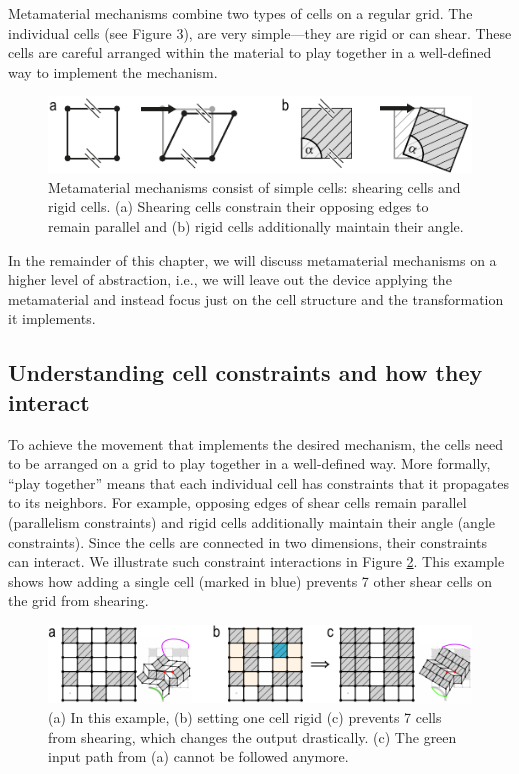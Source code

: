Metamaterial mechanisms combine two types of cells on a regular grid. The individual cells (see Figure 3), are very simple---they are rigid or can shear. These cells are careful arranged within the material to play together in a well-defined way to implement the mechanism.

\begin{figure} [h]
    \includegraphics[width=\textwidth]{chapters/understanding-metamaterial-mechanisms-FIG/3-individual-cells.pdf}
    \caption[Short figure name.]{Metamaterial mechanisms consist of simple cells: shearing cells and rigid cells. (a) Shearing cells constrain their opposing edges to remain parallel and (b) rigid cells additionally maintain their angle.
    \label{fig:3-individual-cells}}
\end{figure}

In the remainder of this chapter, we will discuss metamaterial mechanisms on a higher level of abstraction, i.e., we will leave out the device applying the metamaterial and instead focus just on the cell structure and the transformation it implements.


\subsection{Understanding cell constraints and how they interact}

To achieve the movement that implements the desired mechanism, the cells need to be arranged on a grid to play together in a well-defined way. More formally, “play together” means that each individual cell has constraints that it propagates to its neighbors. For example, opposing edges of shear cells remain parallel (parallelism constraints) and rigid cells additionally maintain their angle (angle constraints). Since the cells are connected in two dimensions, their constraints can interact. We illustrate such constraint interactions in Figure \ref{fig:4-constraint-interaction}. This example shows how adding a single cell (marked in blue) prevents 7 other shear cells on the grid from shearing.

\begin{figure} [h]
    \includegraphics[width=\textwidth]{chapters/understanding-metamaterial-mechanisms-FIG/4-constraint-interaction.pdf}
    \caption[Short figure name.]{(a) In this example, (b) setting one cell rigid (c) prevents 7 cells from shearing, which changes the output drastically. (c) The green input path from (a) cannot be followed anymore.
    \label{fig:4-constraint-interaction}}
\end{figure}

